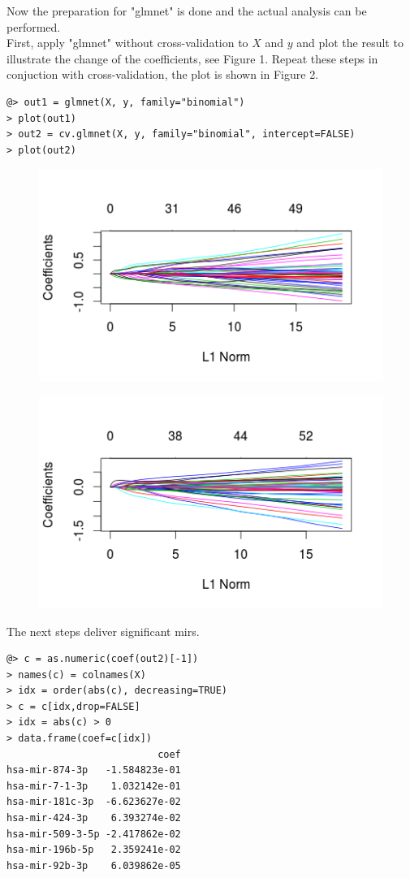 \documentclass{TechReport}
\begin{document}
Now the preparation for "glmnet" is done and the actual analysis can be performed.\\
First, apply "glmnet" without cross-validation to $X$ and $y$ and plot the result 
to illustrate the change of the coefficients, see Figure 1. Repeat these steps in conjuction with
cross-validation, the plot is shown in Figure 2.
\begin{lstlisting}[style=base]
@> out1 = glmnet(X, y, family="binomial")
> plot(out1)
> out2 = cv.glmnet(X, y, family="binomial", intercept=FALSE)
> plot(out2)
\end{lstlisting}
\begin{figure}[h!]
\centering
\includegraphics[]{Rplot1.png}
\end{figure}
\begin{figure}[h!]
\centering
\includegraphics[]{Rplot2.png}
\end{figure}
The next steps deliver significant mirs.
\begin{lstlisting}[style=base]
@> c = as.numeric(coef(out2)[-1])
> names(c) = colnames(X)
> idx = order(abs(c), decreasing=TRUE)
> c = c[idx,drop=FALSE]
> idx = abs(c) > 0
> data.frame(coef=c[idx])
                          coef
hsa-mir-874-3p   -1.584823e-01
hsa-mir-7-1-3p    1.032142e-01
hsa-mir-181c-3p  -6.623627e-02
hsa-mir-424-3p    6.393274e-02
hsa-mir-509-3-5p -2.417862e-02
hsa-mir-196b-5p   2.359241e-02
hsa-mir-92b-3p    6.039862e-05
\end{lstlisting}
\end{document}
